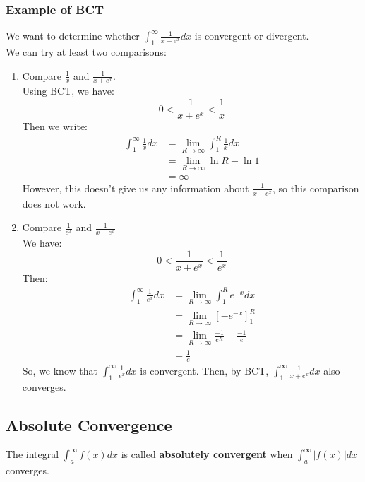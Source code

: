 \documentclass{article}
\begin{document}
\subsubsection{Example of BCT}
We want to determine whether $\int_1^\infty \frac{1}{x+e^x} dx$ is convergent or divergent.\\
We can try at least two comparisons:
\begin{enumerate}
    \item Compare $\frac{1}{x}$ and $\frac{1}{x + e^x}$.\\
    Using BCT, we have:
    $$0 < \frac{1}{x+e^x} <\frac{1}{x}$$
    Then we write:
    \begin{align*}
        \int_1^\infty \frac{1}{x} dx & = \lim_{R \to \infty} \int_1^R \frac{1}{x} dx\\
        & = \lim_{R\to\infty} \ln R - \ln 1\\
        & = \infty
    \end{align*}
    However, this doesn't give us any information about $\frac{1}{x+e^x}$, so this comparison does not work.
    
    \item Compare $\frac{1}{e^x}$ and $\frac{1}{x + e^x}$\\
    We have:
    $$0 < \frac{1}{x + e^x} < \frac{1}{e^x}$$
    Then:
    \begin{align*}
        \int_1^\infty \frac{1}{e^x} dx & = \lim_{R\to\infty} \int_1^R e^{-x} dx\\
        & = \lim_{R\to\infty} [-e^{-x}]_1^R\\
        & = \lim_{R\to\infty} \frac{-1}{e^R} - \frac{-1}{e}\\
        & = \frac{1}{e}
    \end{align*}
    So, we know that $\int_1^\infty \frac{1}{e^x}dx$ is convergent. Then, by BCT, $\int_1^\infty \frac{1}{x+e^x} dx$ also converges.
\end{enumerate}

\subsection{Absolute Convergence}
The integral $\int_a^\infty f(x) dx$ is called \textbf{absolutely convergent} when $\int_a^\infty |f(x)| dx$ converges.
\end{document}
